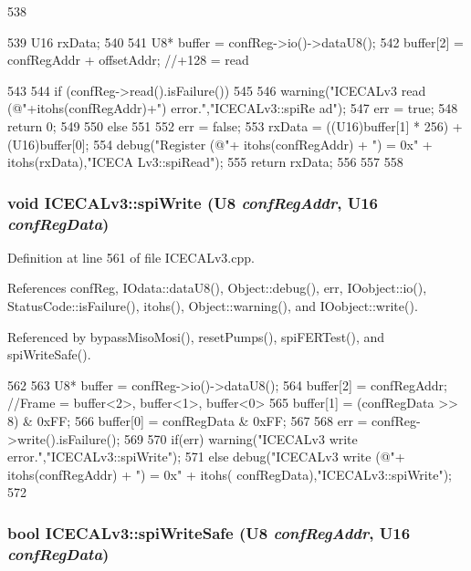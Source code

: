 \begin{DoxyCode}
538 {
539     U16 rxData;
540 
541     U8* buffer = confReg->io()->dataU8();
542     buffer[2]  = confRegAddr + offsetAddr;                          //+128 = read
          
543 
544     if (confReg->read().isFailure()) 
545     {
546         warning("ICECALv3 read (@"+itohs(confRegAddr)+") error.","ICECALv3::spiRe
      ad");
547         err = true;
548         return 0;
549     }
550     else
551     {
552         err = false;
553         rxData = ((U16)buffer[1] * 256) + (U16)buffer[0];
554         debug("Register (@"+ itohs(confRegAddr) + ") = 0x" + itohs(rxData),"ICECA
      Lv3::spiRead");
555         return rxData;
556     }
557 
558 }
\end{DoxyCode}
\hypertarget{classICECALv3_aef00f02801dea4bda2093c930501dcdd}{
\subsubsection[{spiWrite}]{\setlength{\rightskip}{0pt plus 5cm}void ICECALv3::spiWrite ({\bf U8} {\em confRegAddr}, \/  {\bf U16} {\em confRegData})}}
\label{classICECALv3_aef00f02801dea4bda2093c930501dcdd}


Definition at line 561 of file ICECALv3.cpp.

References confReg, IOdata::dataU8(), Object::debug(), err, IOobject::io(), StatusCode::isFailure(), itohs(), Object::warning(), and IOobject::write().

Referenced by bypassMisoMosi(), resetPumps(), spiFERTest(), and spiWriteSafe().


\begin{DoxyCode}
562 {
563     U8* buffer = confReg->io()->dataU8();
564     buffer[2] = confRegAddr;                                //Frame = buffer<2>, 
      buffer<1>, buffer<0>
565     buffer[1] = (confRegData >> 8) & 0xFF;
566     buffer[0] =  confRegData       & 0xFF;
567 
568     err = confReg->write().isFailure();
569 
570     if(err)     warning("ICECALv3 write error.","ICECALv3::spiWrite");
571     else      debug("ICECALv3 write (@"+ itohs(confRegAddr) + ") = 0x" + itohs(
      confRegData),"ICECALv3::spiWrite");
572 }
\end{DoxyCode}
\hypertarget{classICECALv3_aa0b8358ea0be8e47a8aded5e1551787f}{
\subsubsection[{spiWriteSafe}]{\setlength{\rightskip}{0pt plus 5cm}bool ICECALv3::spiWriteSafe ({\bf U8} {\em confRegAddr}, \/  {\bf U16} {\em confRegData})}}
\label{classICECALv3_aa0b8358ea0be8e47a8aded5e1551787f}


